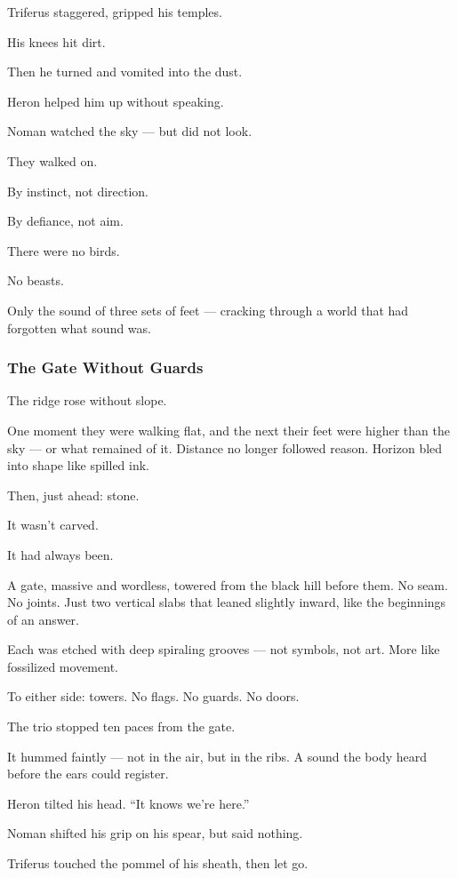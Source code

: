 \documentclass[12pt]{article}
\begin{document}
Triferus staggered, gripped his temples.

His knees hit dirt.

Then he turned and vomited into the dust.

Heron helped him up without speaking.

Noman watched the sky — but did not look.

\bigskip

They walked on.

By instinct, not direction.

By defiance, not aim.

There were no birds.

No beasts.

Only the sound of three sets of feet — cracking through a world that had forgotten what sound was.

\dotfill

\subsubsection*{The Gate Without Guards}

The ridge rose without slope.

One moment they were walking flat, and the next their feet were higher than the sky — or what remained of it. Distance no longer followed reason. Horizon bled into shape like spilled ink.

Then, just ahead: stone.

It wasn’t carved.

It had always been.

A gate, massive and wordless, towered from the black hill before them. No seam. No joints. Just two vertical slabs that leaned slightly inward, like the beginnings of an answer.

Each was etched with deep spiraling grooves — not symbols, not art. More like fossilized movement.

To either side: towers. No flags. No guards. No doors.

\bigskip

The trio stopped ten paces from the gate.

It hummed faintly — not in the air, but in the ribs. A sound the body heard before the ears could register.

Heron tilted his head. “It knows we’re here.”

Noman shifted his grip on his spear, but said nothing.

Triferus touched the pommel of his sheath, then let go.
\end{document}
